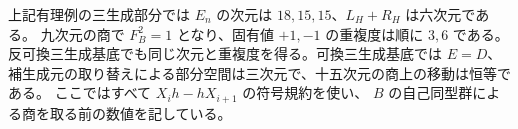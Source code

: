 上記有理例の三生成部分では $E_n$ の次元は $18,15,15$、$L_H+R_H$ は六次元である。
九次元の商で $F_B^2=1$ となり、固有値 $+1,-1$ の重複度は順に $3,6$ である。
反可換三生成基底でも同じ次元と重複度を得る。可換三生成基底では
$E=D$、補生成元の取り替えによる部分空間は三次元で、十五次元の商上の移動は恒等である。
ここではすべて $X_i h-hX_{i+1}$ の符号規約を使い、
$B$ の自己同型群による商を取る前の数値を記している。
